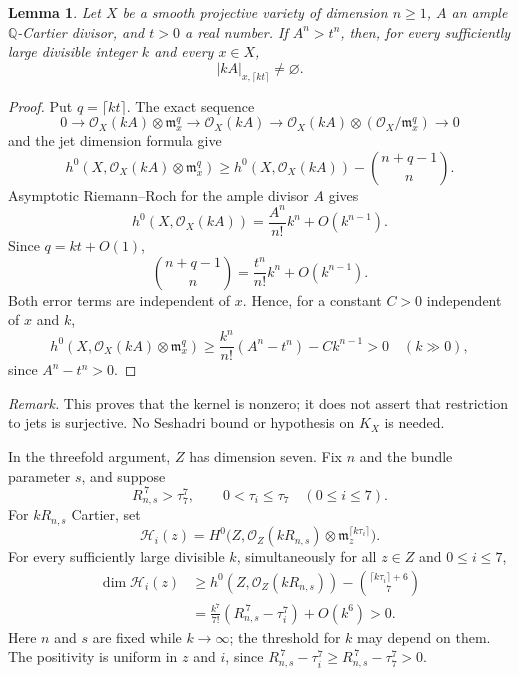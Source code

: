 \documentclass[12pt,a4paper,psamsfonts]{amsart}
\newtheorem{lemma}{Lemma}[section]
\theoremstyle{definition}
\newcommand{\OO}{\mathcal O}
\begin{document}
\begin{lemma}\label{lem:volume-high-order-sections}
Let $X$ be a smooth projective variety of dimension $n\ge1$,
$A$ an ample $\mathbb{Q}$-Cartier divisor, and $t>0$ a real number.
If $A^n>t^n$, then, for every sufficiently large divisible integer
$k$ and every $x\in X$,
\[
 |kA|_{x,\lceil kt\rceil}\ne\varnothing.
\]
\end{lemma}
\begin{proof}
Put $q=\lceil kt\rceil$. The exact sequence
\[
 0\longrightarrow\OO_X(kA)\otimes\mathfrak m_x^q
 \longrightarrow\OO_X(kA)
 \longrightarrow\OO_X(kA)\otimes(\OO_X/\mathfrak m_x^q)
 \longrightarrow0
\]
and the jet dimension formula give
\[
 h^0(X,\OO_X(kA)\otimes\mathfrak m_x^q)
 \ge h^0(X,\OO_X(kA))-\binom{n+q-1}{n}.
\]
Asymptotic Riemann--Roch for the ample divisor $A$ gives
\[
 h^0(X,\OO_X(kA))=\frac{A^n}{n!}k^n+O(k^{n-1}).
\]
Since $q=kt+O(1)$,
\[
 \binom{n+q-1}{n}=\frac{t^n}{n!}k^n+O(k^{n-1}).
\]
Both error terms are independent of $x$. Hence, for a constant
$C>0$ independent of $x$ and $k$,
\[
 h^0(X,\OO_X(kA)\otimes\mathfrak m_x^q)
 \ge\frac{k^n}{n!}(A^n-t^n)-Ck^{n-1}>0
 \quad(k\gg0),
\]
since $A^n-t^n>0$.
\end{proof}

\noindent\emph{Remark.} This proves that the kernel is nonzero;
it does not assert that restriction to jets is surjective.
No Seshadri bound or hypothesis on $K_X$ is needed.

In the threefold argument, $Z$ has dimension seven. Fix $n$ and
the bundle parameter $s$, and suppose
\[
 R_{n,s}^{\,7}>\tau_7^7,\qquad
 0<\tau_i\le\tau_7\quad(0\le i\le7).
\]
For $kR_{n,s}$ Cartier, set
\[
 \mathcal H_i(z)=H^0\bigl(Z,\OO_Z(kR_{n,s})\otimes
                  \mathfrak m_z^{\lceil k\tau_i\rceil}\bigr).
\]
For every sufficiently large divisible $k$, simultaneously for
all $z\in Z$ and $0\le i\le7$,
\[
 \begin{aligned}
 \dim\mathcal H_i(z)
 &\ge h^0(Z,\OO_Z(kR_{n,s}))
             -\binom{\lceil k\tau_i\rceil+6}{7}\\
 &=\frac{k^7}{7!}(R_{n,s}^{\,7}-\tau_i^7)+O(k^6)>0.
 \end{aligned}
\]
Here $n$ and $s$ are fixed while $k\to\infty$; the threshold for
$k$ may depend on them. The positivity is uniform in $z$ and $i$,
since $R_{n,s}^{\,7}-\tau_i^7\ge R_{n,s}^{\,7}-\tau_7^7>0$.
\end{document}
